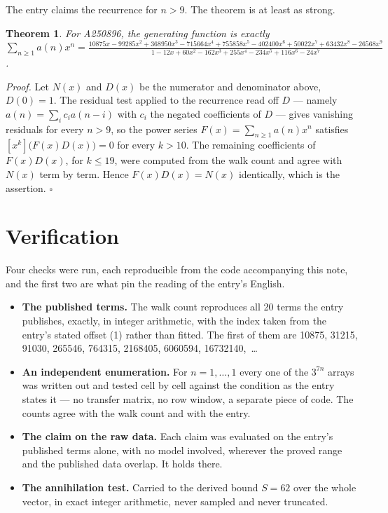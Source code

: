 \documentclass[11pt]{article}
\newtheorem{theorem}{Theorem}
\theoremstyle{definition}
\begin{document}
The entry claims the recurrence for $n > 9$. The theorem is at least as strong.

\begin{theorem} For A250896, the generating function is exactly $\sum_{n\ge 1} a(n)x^n = \frac{10875x - 99285x^{2} + 368950x^{3} - 715664x^{4} + 755858x^{5} - 402400x^{6} + 50022x^{7} + 63432x^{8} - 26568x^{9}}{1 - 12x + 60x^{2} - 162x^{3} + 255x^{4} - 234x^{5} + 116x^{6} - 24x^{7}}$.\end{theorem}

{\itshape Proof.} Let $N(x)$ and $D(x)$ be the numerator and denominator above, $D(0)=1$. The residual test applied to the recurrence read off $D$ --- namely $a(n) = \sum_i c_i a(n-i)$ with $c_i$ the negated coefficients of $D$ --- gives vanishing residuals for every $n > 9$, so the power series $F(x)=\sum_{n\ge 1}a(n)x^n$ satisfies $[x^k]\bigl(F(x)D(x)\bigr) = 0$ for every $k > 10$. The remaining coefficients of $F(x)D(x)$, for $k \le 19$, were computed from the walk count and agree with $N(x)$ term by term. Hence $F(x)D(x) = N(x)$ identically, which is the assertion. $\square$

\section{Verification}

Four checks were run, each reproducible from the code accompanying this note, and the first two are what pin the reading of the entry's English.

\begin{itemize}

\item {\bfseries The published terms.} The walk count reproduces all 20 terms the entry publishes, exactly, in integer arithmetic, with the index taken from the entry's stated offset (1) rather than fitted. The first of them are 10875, 31215, 91030, 265546, 764315, 2168405, 6060594, 16732140,~\dots

\item {\bfseries An independent enumeration.} For $n = 1,\dots,1$ every one of the $3^{7n}$ arrays was written out and tested cell by cell against the condition as the entry states it --- no transfer matrix, no row window, a separate piece of code. The counts agree with the walk count and with the entry.

\item {\bfseries The claim on the raw data.} Each claim was evaluated on the entry's published terms alone, with no model involved, wherever the proved range and the published data overlap. It holds there.

\item {\bfseries The annihilation test.} Carried to the derived bound $S = 62$ over the whole vector, in exact integer arithmetic, never sampled and never truncated.

\end{itemize}
\end{document}
